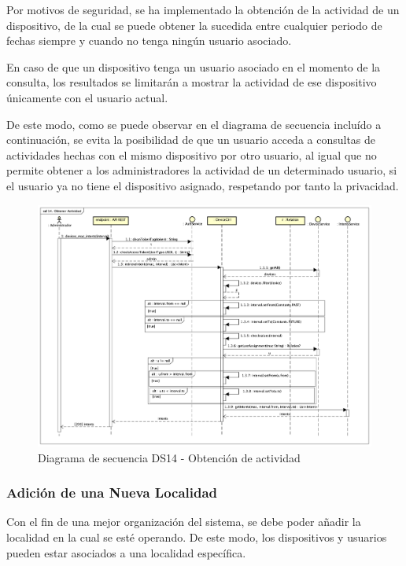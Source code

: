 Por motivos de seguridad, se ha implementado la obtención de la actividad de un dispositivo, de la cual se puede obtener la sucedida entre cualquier periodo de fechas siempre y cuando no tenga ningún usuario asociado.

En caso de que un dispositivo tenga un usuario asociado en el momento de la consulta, los resultados se limitarán a mostrar la actividad de ese dispositivo únicamente con el usuario actual.

De este modo, como se puede observar en el diagrama de secuencia incluído a continuación, se evita la posibilidad de que un usuario acceda a consultas de actividades hechas con el mismo dispositivo por otro usuario, al igual que no permite obtener a los administradores la actividad de un determinado usuario, si el usuario ya no tiene el dispositivo asignado, respetando por tanto la privacidad.

\begin{figure}[H]
    \centering
    \includegraphics[width=14cm]{./img/sequence/diagram/ObtenerActividad.png}
    \caption{Diagrama de secuencia DS14 - Obtención de actividad}
    \label{fig:seq.GetTask}
\end{figure}


\subsubsection{Adición de una Nueva Localidad}

Con el fin de una mejor organización del sistema, se debe poder añadir la localidad en la cual se esté operando. De este modo, los dispositivos y usuarios pueden estar asociados a una localidad específica.

